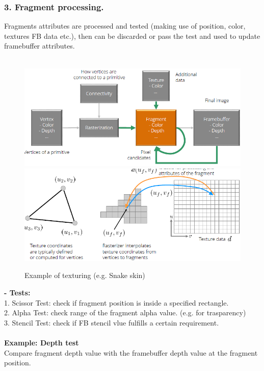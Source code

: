 \documentclass{article}
\begin{document}
\subsubsection{3. Fragment processing.}
Fragments attributes are processed and tested (making use of position, color, textures FB data etc.), then can be discarded or pass the test and used to update 
framebuffer attributes.\\\\
\begin{figure}[h!]
\includegraphics[scale=0.5]{image59.png}
\includegraphics[scale=0.5]{image60.png}
\caption{Example of texturing (e.g. Snake skin)}
\end{figure}
\textbf{- Tests:}\\
1. Scissor Test: check if fragment position is inside a specified rectangle.\\
2. Alpha Test: check range of the fragment alpha value. (e.g. for trasparency)\\
3. Stencil Test: check if FB stencil vlue fulfills a certain requirement.\\\\
\textbf{Example: Depth test}\\
Compare fragment depth value with the framebuffer depth value at the fragment position.\\\\
\end{document}
